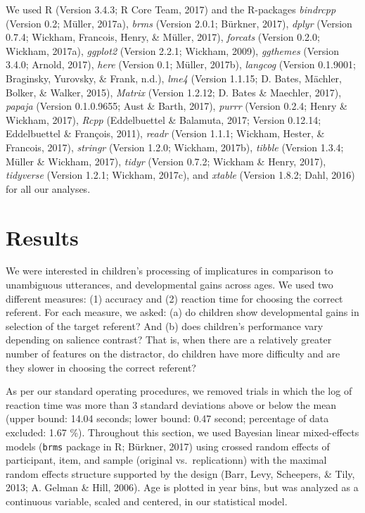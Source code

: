 \documentclass[man]{apa6}
\theoremstyle{definition}
\theoremstyle{definition}
\theoremstyle{definition}
\theoremstyle{remark}
\begin{document}
We used R (Version 3.4.3; R Core Team, 2017) and the R-packages
\emph{bindrcpp} (Version 0.2; Müller, 2017a), \emph{brms} (Version
2.0.1; Bürkner, 2017), \emph{dplyr} (Version 0.7.4; Wickham, Francois,
Henry, \& Müller, 2017), \emph{forcats} (Version 0.2.0; Wickham, 2017a),
\emph{ggplot2} (Version 2.2.1; Wickham, 2009), \emph{ggthemes} (Version
3.4.0; Arnold, 2017), \emph{here} (Version 0.1; Müller, 2017b),
\emph{langcog} (Version 0.1.9001; Braginsky, Yurovsky, \& Frank, n.d.),
\emph{lme4} (Version 1.1.15; D. Bates, Mächler, Bolker, \& Walker,
2015), \emph{Matrix} (Version 1.2.12; D. Bates \& Maechler, 2017),
\emph{papaja} (Version 0.1.0.9655; Aust \& Barth, 2017), \emph{purrr}
(Version 0.2.4; Henry \& Wickham, 2017), \emph{Rcpp} (Eddelbuettel \&
Balamuta, 2017; Version 0.12.14; Eddelbuettel \& François, 2011),
\emph{readr} (Version 1.1.1; Wickham, Hester, \& Francois, 2017),
\emph{stringr} (Version 1.2.0; Wickham, 2017b), \emph{tibble} (Version
1.3.4; Müller \& Wickham, 2017), \emph{tidyr} (Version 0.7.2; Wickham \&
Henry, 2017), \emph{tidyverse} (Version 1.2.1; Wickham, 2017c), and
\emph{xtable} (Version 1.8.2; Dahl, 2016) for all our analyses.

\section{Results}\label{results}

We were interested in children's processing of implicatures in
comparison to unambiguous utterances, and developmental gains across
ages. We used two different measures: (1) accuracy and (2) reaction time
for choosing the correct referent. For each measure, we asked: (a) do
children show developmental gains in selection of the target referent?
And (b) does children's performance vary depending on salience contrast?
That is, when there are a relatively greater number of features on the
distractor, do children have more difficulty and are they slower in
choosing the correct referent?

As per our standard operating procedures, we removed trials in which the
log of reaction time was more than 3 standard deviations above or below
the mean (upper bound: 14.04 seconds; lower bound: 0.47 second;
percentage of data excluded: 1.67 \%). Throughout this section, we used
Bayesian linear mixed-effects models (\texttt{brms} package in R;
Bürkner, 2017) using crossed random effects of participant, item, and
sample (original vs.~replicationn) with the maximal random effects
structure supported by the design (Barr, Levy, Scheepers, \& Tily, 2013;
A. Gelman \& Hill, 2006). Age is plotted in year bins, but was analyzed
as a continuous variable, scaled and centered, in our statistical model.
\end{document}

